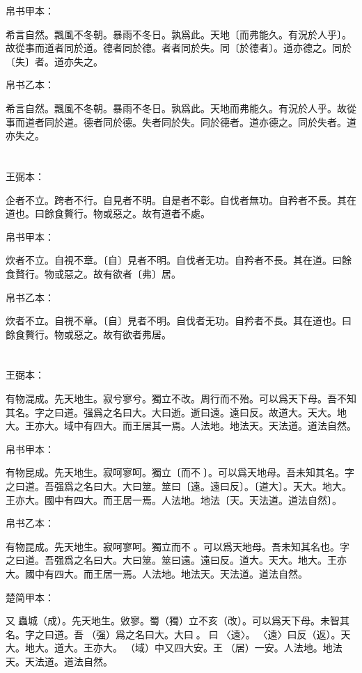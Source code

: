 \documentclass[a5paper]{ctexbook}
\begin{document}
    
    帛书甲本：

    希言自然。飄風不冬朝。暴雨不冬日。孰爲此。天地〔而弗能久。有況於人乎〕。故從事而道者同於道。德者同於德。者者同於失。同〔於德者〕。道亦德之。同於〔失〕者。道亦失之。

    帛书乙本：

    希言自然。飄風不冬朝。暴雨不冬日。孰爲此。天地而弗能久。有況於人乎。故從事而道者同於道。德者同於德。失者同於失。同於德者。道亦德之。同於失者。道亦失之。

    \chapter{}
    王弼本：

    企者不立。跨者不行。自見者不明。自是者不彰。自伐者無功。自矜者不長。其在道也。曰餘食贅行。物或惡之。故有道者不處。

    
    帛书甲本：

    炊者不立。自視不章。〔自〕見者不明。自伐者无功。自矜者不長。其在道。曰餘食贅行。物或惡之。故有欲者〔弗〕居。

    帛书乙本：

    炊者不立。自視不章。〔自〕見者不明。自伐者无功。自矜者不長。其在道也。曰餘食贅行。物或惡之。故有欲者弗居。

    \chapter{}
    王弼本：

    有物混成。先天地生。寂兮寥兮。獨立不改。周行而不殆。可以爲天下母。吾不知其名。字之曰道。强爲之名曰大。大曰逝。逝曰遠。遠曰反。故道大。天大。地大。王亦大。域中有四大。而王居其一焉。人法地。地法天。天法道。道法自然。

    
    帛书甲本：

    有物昆成。先天地生。寂呵寥呵。獨立〔而不󱁡〕。可以爲天地母。吾未知其名。字之曰道。吾强爲之名曰大。大曰筮。筮曰〔遠。遠曰反〕。〔道大〕。天大。地大。王亦大。國中有四大。而王居一焉。人法地。地法〔天。天法道。道法自然〕。

    帛书乙本：

    有物昆成。先天地生。寂呵寥呵。獨立而不󱁡。可以爲天地母。吾未知其名也。字之曰道。吾强爲之名曰大。大曰筮。筮曰遠。遠曰反。道大。天大。地大。王亦大。國中有四大。而王居一焉。人法地。地法天。天法道。道法自然。

    楚简甲本：

    又󶴷蟲城（成）。先天地生。敓寥。蜀（獨）立不亥（改）。可以爲天下母。未智其名。字之曰道。吾󶴔（强）爲之名曰大。大曰󶴹。󶴹曰󶴿〈遠〉。󶴿〈遠〉曰反（返）。天大。地大。道大。王亦大。󶴺（域）中又四大安。王󶵀（居）一安。人法地。地法天。天法道。道法自然。
\end{document}
